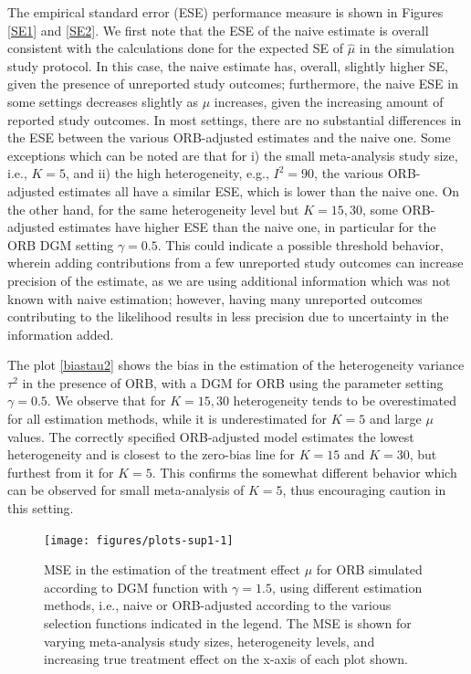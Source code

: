 \documentclass{article}\usepackage[]{graphicx}\usepackage[]{xcolor}
\begin{document}
\bigskip

The empirical standard error (ESE) performance measure is shown in Figures \ref{SE1} and \ref{SE2}. We first note that the ESE of the naive estimate is overall consistent with the calculations done for the expected SE of $\hat{\mu}$ in the simulation study protocol. In this case, the naive estimate has, overall, slightly higher SE, given the presence of unreported study outcomes; furthermore, the naive ESE in some settings decreases slightly as $\mu$ increases, given the increasing amount of reported study outcomes. In most settings, there are no substantial differences in the ESE between the various ORB-adjusted estimates and the naive one. Some exceptions which can be noted are that for i) the small meta-analysis study size, i.e., $K=5$, and ii) the high heterogeneity, e.g., $I^2=90$, the various ORB-adjusted estimates all have a similar ESE, which is lower than the naive one. On the other hand, for the same heterogeneity level but $K=15, 30$, some ORB-adjusted estimates have higher ESE than the naive one, in particular for the ORB DGM setting $\gamma=0.5$. This could indicate a possible threshold behavior, wherein adding contributions from a few unreported study outcomes can increase precision of the estimate, as we are using additional information which was not known with naive estimation; however, having many unreported outcomes contributing to the likelihood results in less precision due to uncertainty in the information added. 

\bigskip

The plot \ref{biastau2} shows the bias in the estimation of the heterogeneity variance $\tau^2$ in the presence of ORB, with a DGM for ORB using the parameter setting $\gamma=0.5$. We observe that for $K=15,30$ heterogeneity tends to be overestimated for all estimation methods, while it is underestimated for $K=5$ and large $\mu$ values. The correctly specified ORB-adjusted model estimates the lowest heterogeneity and is closest to the zero-bias line for $K=15$ and $K=30$, but furthest from it for $K=5$. This confirms the somewhat different behavior which can be observed for small meta-analysis of $K=5$, thus encouraging caution in this setting.




\begin{figure}[!hbt]
\centering
\caption{MSE in the estimation of the treatment effect $\mu$ for ORB simulated according to DGM function with $\gamma=1.5$, using different estimation methods, i.e., naive or ORB-adjusted according to the various selection functions indicated in the legend. The MSE is shown for varying meta-analysis study sizes, heterogeneity levels, and increasing true treatment effect on the x-axis of each plot shown.\\[0.5em]}


{\centering \texttt{[image: figures/plots-sup1-1]} 

}



\label{MSE1}
\end{figure}
\end{document}
